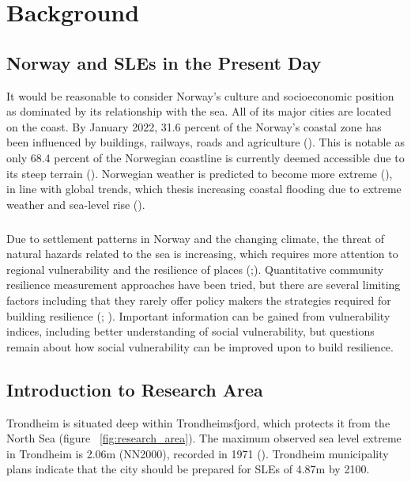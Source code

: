 \chapter{Background}

\section{Norway and SLEs in the Present Day}
 It would be reasonable to consider Norway's culture and socioeconomic position as dominated by its relationship with the sea. All of its major cities are located on the coast.  By January 2022, 31.6 percent of the Norway's coastal zone has been influenced by buildings, railways, roads and agriculture (\cite{engebakken_construction_2022}). This is notable as only 68.4 percent of the Norwegian coastline is currently deemed accessible due to its steep terrain (\cite{engebakken_construction_2022}). Norwegian weather is predicted to become more extreme (\cite{rod_integrated_2012}), in line with global trends, which thesis increasing coastal flooding due to extreme weather and sea-level rise (\cite{hoffken_effects_2020}). 
\paragraph{}

Due to settlement patterns in Norway and the changing climate, the threat of natural hazards related to the sea is increasing, which requires more attention to regional vulnerability and the resilience of places (\cite{opach_seeking_2020};\cite{rod_three_2015}). Quantitative community resilience measurement approaches have been tried, but there are several limiting factors including that they rarely offer policy makers the strategies required for building resilience (\cite{opach_seeking_2020}; \cite{gerkensmeier_governing_2018}). Important information can be gained from vulnerability indices, including better understanding of social vulnerability, but questions remain about how social vulnerability can be improved upon to build resilience. 


\section{Introduction to Research Area}

Trondheim is situated deep within Trondheimsfjord, which protects it from the North Sea (figure ~\ref{fig:research_area}). The maximum observed sea level extreme in Trondheim is 2.06m (NN2000), recorded in 1971 (\cite{tides_high_2022}). Trondheim municipality plans indicate that the city should be prepared for SLEs of 4.87m by 2100. 
